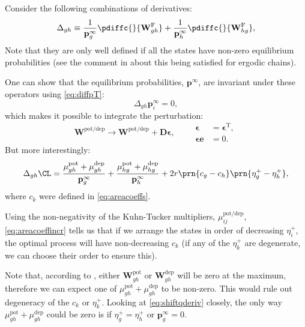 \documentclass{article} %
\newcommand{\trans}{^\mathrm{T}}
\newcommand{\onev}{\mathbf{e}}
\newcommand{\pr}{\mathbf{p}}
\newcommand{\eq}{\pr^\infty}
\newcommand{\D}{\mathbf{D}}
\newcommand{\W}{\mathbf{W}}
\newcommand{\frg}{\W^{\mathrm{F}}}
\newcommand{\pot}{^{\text{pot}}}
\newcommand{\dep}{^{\text{dep}}}
\newcommand{\potdep}{^{\text{pot/dep}}}
\begin{document}
Consider the following combinations of derivatives:
%
\begin{align}
\label{eq:areacoeffincrderiv}
    \Delta_{gh} &\equiv
      \frac{1}{\eq_{g}} \pdiffc{}{\frg_{gh}}
      + \frac{1}{\eq_h} \pdiffc{}{\frg_{hg}}, \\
\end{align}
%
Note that they are only well defined if all the states have non-zero equilibrium probabilities (see the comment in  about this being satisfied for ergodic chains).

One can show that the equilibrium probabilities, $\eq$, are invariant under these operators using \eqref{eq:diffpT}:
%
\begin{equation}\label{eq:sareacoeffincrprob}
  \Delta_{gh} \eq_i = 0,
\end{equation}
%
which makes it possible to integrate the perturbation:
%
\begin{equation}\label{eq:areacoeffincrfinite}
  \W\potdep  \to \W\potdep  + \D\boldsymbol{\epsilon},
  \qquad
  \begin{aligned}
  \boldsymbol{\epsilon} &= \boldsymbol{\epsilon}\trans,
  \\
  \boldsymbol{\epsilon} \onev &= 0.
  \end{aligned}
\end{equation}
%
But more interestingly:
%
\begin{align}
\label{eq:areacoeffincr}
    \Delta_{gh}\CL &=
      \frac{\mu\pot _{gh}+\mu\dep _{gh}}{\eq_g} + \frac{\mu\pot _{hg}+\mu\dep _{hg}}{\eq_h}
      + 2r\prn{c_g-c_h}\prn{\eta^+_{g} - \eta^+_{h}},\\
\end{align}
%
where $c_k$ were defined in \eqref{eq:areacoeffs}.

Using the non-negativity of the Kuhn-Tucker multipliers, $\mu\potdep _{ij}$, \eqref{eq:areacoeffincr} tells us that if we arrange the states in order of decreasing $\eta^+_i$, the optimal process will have non-decreasing $c_k$ (if any of the $\eta^+_k$ are degenerate, we can choose their order to ensure this).

Note that, according to , either $\W\pot _{gh}$ or $\W\dep _{gh}$ will be zero at the maximum, therefore we can expect one of $\mu\pot _{gh}+\mu\dep _{gh}$ to be non-zero.
This would rule out degeneracy of the $c_k$ or $\eta^+_k$.
Looking at \eqref{eq:shiftqderiv} closely, the only way $\mu\pot _{gh}+\mu\dep _{gh}$ could be zero is if $\eta^+_g=\eta^+_h$ or $\eq_g=0$.
\end{document}
